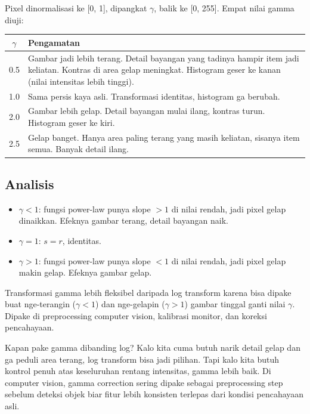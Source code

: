 \documentclass[11pt,a4paper]{article}
\begin{document}
Pixel dinormalisasi ke [0, 1], dipangkat $\gamma$, balik ke [0, 255]. Empat nilai gamma diuji:

\begin{center}
\begin{tabularx}{\textwidth}{c X}
\toprule
$\gamma$ & Pengamatan \\
\midrule
0.5  & Gambar jadi lebih terang. Detail bayangan yang tadinya hampir item jadi keliatan. Kontras di area gelap meningkat. Histogram geser ke kanan (nilai intensitas lebih tinggi). \\
1.0  & Sama persis kaya asli. Transformasi identitas, histogram ga berubah. \\
2.0  & Gambar lebih gelap. Detail bayangan mulai ilang, kontras turun. Histogram geser ke kiri. \\
2.5  & Gelap banget. Hanya area paling terang yang masih keliatan, sisanya item semua. Banyak detail ilang. \\
\bottomrule
\end{tabularx}
\end{center}

\subsection{Analisis}

\begin{itemize}
    \item $\gamma < 1$: fungsi power-law punya slope $> 1$ di nilai rendah, jadi pixel gelap dinaikkan. Efeknya gambar terang, detail bayangan naik.
    \item $\gamma = 1$: $s = r$, identitas.
    \item $\gamma > 1$: fungsi power-law punya slope $< 1$ di nilai rendah, jadi pixel gelap makin gelap. Efeknya gambar gelap.
\end{itemize}

Transformasi gamma lebih fleksibel daripada log transform karena bisa dipake buat nge-terangin ($\gamma < 1$) dan nge-gelapin ($\gamma > 1$) gambar tinggal ganti nilai $\gamma$. Dipake di preprocessing computer vision, kalibrasi monitor, dan koreksi pencahayaan.

Kapan pake gamma dibanding log? Kalo kita cuma butuh narik detail gelap dan ga peduli area terang, log transform bisa jadi pilihan. Tapi kalo kita butuh kontrol penuh atas keseluruhan rentang intensitas, gamma lebih baik. Di computer vision, gamma correction sering dipake sebagai preprocessing step sebelum deteksi objek biar fitur lebih konsisten terlepas dari kondisi pencahayaan asli.
\end{document}
